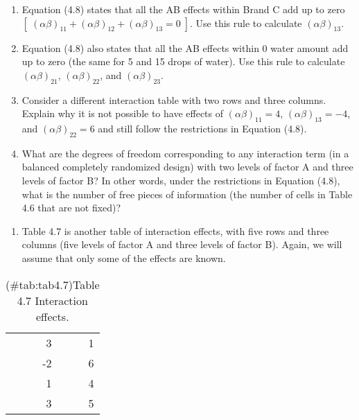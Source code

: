 \documentclass[
]{report}
\providecommand{\tightlist}{%
  \setlength{\itemsep}{0pt}\setlength{\parskip}{0pt}}
\theoremstyle{definition}
\theoremstyle{definition}
\theoremstyle{definition}
\theoremstyle{definition}
\theoremstyle{remark}
\begin{document}
\begin{enumerate}
\def\labelenumi{\alph{enumi}.}
\item
  Equation (4.8) states that all the AB effects within Brand C add up to zero \([\;(\alpha\beta)_{11} + (\alpha\beta)_{12} + (\alpha\beta)_{13} = 0\;]\). Use this rule to calculate \((\alpha\beta)_{13}\).
\item
  Equation (4.8) also states that all the AB effects within 0 water amount add up to zero (the same for 5 and 15 drops of water). Use this rule to calculate \((\alpha\beta)_{21}\), \((\alpha\beta)_{22}\), and \((\alpha\beta)_{23}\).
\item
  Consider a different interaction table with two rows and three columns. Explain why it is not possible to have effects of \((\alpha\beta)_{11}=4\), \((\alpha\beta)_{13}=-4\), and \((\alpha\beta)_{22}=6\) and still follow the restrictions in Equation (4.8).
\item
  What are the degrees of freedom corresponding to any interaction term (in a balanced completely randomized design) with two levels of factor A and three levels of factor B? In other words, under the restrictions in Equation (4.8), what is the number of free pieces of information (the number of cells in Table 4.6 that are not fixed)?
\end{enumerate}

\begin{enumerate}
\def\labelenumi{\arabic{enumi}.}
\setcounter{enumi}{31}
\tightlist
\item
  Table 4.7 is another table of interaction effects, with five rows and three columns (five levels of factor A and three levels of factor B). Again, we will assume that only some of the effects are known.
\end{enumerate}

\begin{table}[!h]
\centering
\caption{(\#tab:tab4.7)Table 4.7 Interaction effects.}
\centering
\begin{tabular}[t]{rr}
\toprule
  &  \\
\midrule
3 & 1\\
-2 & 6\\
1 & 4\\
3 & 5\\
\bottomrule
\end{tabular}
\end{table}
\end{document}
